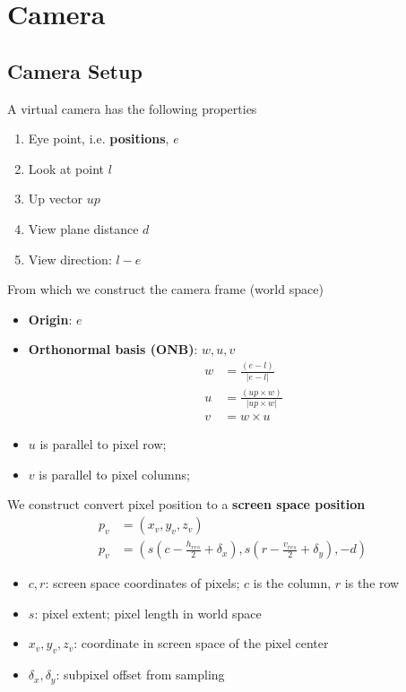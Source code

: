 \chapter{Camera}

\section{Camera Setup}

  A virtual camera has the following properties

  \begin{enumerate}
    \item Eye point, i.e. \textbf{positions}, $ e $
    \item Look at point $ l $
    \item Up vector $ up $
    \item View plane distance $ d $
    \item View direction: $ l - e $
  \end{enumerate}

  From which we construct the camera frame (world space)
  \begin{itemize}
    \item \textbf{Origin}: $ e $
    \item \textbf{Orthonormal basis (ONB)}: $ w, u, v $
    \begin{align}
      w &= \frac{\left( e - l \right)}{\left| e - l \right|} \\
      u &= \frac{\left( up \times w \right)}{\left| up \times w \right|} \\
      v &= w \times u
    \end{align}

    \item $ u $ is parallel to pixel row;
    \item $ v $ is parallel to pixel columns;
  \end{itemize}

  We construct convert pixel position to a
  \textbf{screen space position}
  \begin{align}
    p_{v} &= \left( x_{v}, y_{v}, z_{v} \right) \\
    p_{v} &=
    \left(
      s\left( c - \frac{h_{res}}{2} + \delta_{x} \right),
      s\left( r - \frac{v_{res}}{2} + \delta_{y} \right),
      -d
    \right)
  \end{align}

  \begin{itemize}
    \item $ c, r $: screen space coordinates of pixels; $ c $ is the column,
    $ r $ is the row
    \item $ s $: pixel extent; pixel length in world space
    \item $ x_{v}, y_{v}, z_{v} $: coordinate in screen space of the pixel center
    \item $ \delta_{x}, \delta_{y} $: subpixel offset from sampling
  \end{itemize}

